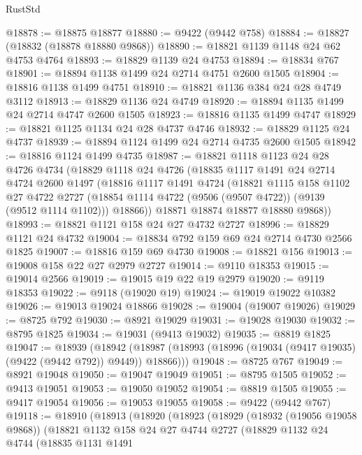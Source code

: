 \begin{lexlean}{RustStd}
\begin{coremodule}
@18878 := @18875 @18877
@18880 := @9422 (@9442 @758)
@18884 := @18827 (@18832 (@18878 @18880 @9868))
@18890 := @18821 @1139 @1148 @24 @62 @4753 @4764
@18893 := @18829 @1139 @24 @4753
@18894 := @18834 @767
@18901 := @18894 @1138 @1499 @24 @2714 @4751 @2600 @1505
@18904 := @18816 @1138 @1499 @4751
@18910 := @18821 @1136 @384 @24 @28 @4749 @3112
@18913 := @18829 @1136 @24 @4749
@18920 := @18894 @1135 @1499 @24 @2714 @4747 @2600 @1505
@18923 := @18816 @1135 @1499 @4747
@18929 := @18821 @1125 @1134 @24 @28 @4737 @4746
@18932 := @18829 @1125 @24 @4737
@18939 := @18894 @1124 @1499 @24 @2714 @4735 @2600 @1505
@18942 := @18816 @1124 @1499 @4735
@18987 := @18821
    @1118
    @1123
    @24
    @28
    @4726
    @4734
    (@18829
      @1118
      @24
      @4726
      (@18835
        @1117
        @1491
        @24
        @2714
        @4724
        @2600
        @1497
        (@18816
          @1117
          @1491
          @4724
          (@18821
            @1115
            @158
            @1102
            @27
            @4722
            @2727
            (@18854 @1114 @4722 (@9506 (@9507 @4722)) (@9139 (@9512 @1114 @1102)))
            @18866))
        @18871
        @18874
        @18877
        @18880
        @9868))
@18993 := @18821 @1121 @158 @24 @27 @4732 @2727
@18996 := @18829 @1121 @24 @4732
@19004 := @18834 @792 @159 @69 @24 @2714 @4730 @2566 @1825
@19007 := @18816 @159 @69 @4730
@19008 := @18821 @156
@19013 := @19008 @158 @22 @27 @2979 @2727
@19014 := @9110 @18353
@19015 := @19014 @2566
@19019 := @19015 @19 @22 @19 @2979
@19020 := @9119 @18353
@19022 := @9118 (@19020 @19)
@19024 := @19019 @19022 @10382
@19026 := @19013 @19024 @18866
@19028 := @19004 (@19007 @19026)
@19029 := @8725 @792
@19030 := @8921 @19029
@19031 := @19028 @19030
@19032 := @8795 @1825
@19034 := @19031 (@9413 @19032)
@19035 := @8819 @1825
@19047 := @18939
    (@18942 (@18987 (@18993 (@18996 (@19034 (@9417 @19035) (@9422 (@9442 @792)) @9449)) @18866)))
@19048 := @8725 @767
@19049 := @8921 @19048
@19050 := @19047 @19049
@19051 := @8795 @1505
@19052 := @9413 @19051
@19053 := @19050 @19052
@19054 := @8819 @1505
@19055 := @9417 @19054
@19056 := @19053 @19055
@19058 := @9422 (@9442 @767)
@19118 := @18910
    (@18913
      (@18920
        (@18923
          (@18929
            (@18932 (@19056 @19058 @9868))
            (@18821
              @1132
              @158
              @24
              @27
              @4744
              @2727
              (@18829
                @1132
                @24
                @4744
                (@18835
                  @1131
                  @1491

\end{coremodule}
\end{lexlean}
